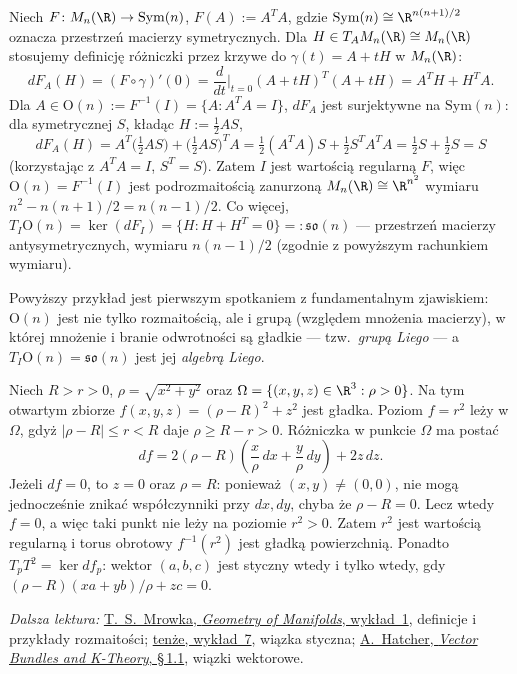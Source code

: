 \begin{przyklad}
Niech $F\colon M_n(\R)\to\mathrm{Sym}(n)$, $F(A):=A^TA$, gdzie $\mathrm{Sym}(n)\cong
\R^{n(n+1)/2}$ oznacza przestrzeń macierzy symetrycznych. Dla $H\in T_AM_n(\R)\cong M_n(\R)$
stosujemy definicję różniczki przez krzywe do $\gamma(t)=A+tH$ w $M_n(\R)$:
\[
dF_A(H)=(F\circ\gamma)'(0)=\frac{d}{dt}\Big|_{t=0}(A+tH)^T(A+tH)=A^TH+H^TA.
\]
Dla $A\in\mathrm{O}(n):=F^{-1}(I)=\{A:A^TA=I\}$, $dF_A$ jest surjektywne na
$\mathrm{Sym}(n)$: dla symetrycznej $S$, kładąc $H:=\tfrac12AS$,
\[
dF_A(H)=A^T\big(\tfrac12AS\big)+\big(\tfrac12AS\big)^TA=\tfrac12(A^TA)S+\tfrac12S^TA^TA=
\tfrac12S+\tfrac12S=S
\]
(korzystając z $A^TA=I$, $S^T=S$). Zatem $I$ jest wartością regularną $F$, więc
$\mathrm{O}(n)=F^{-1}(I)$ jest podrozmaitością zanurzoną $M_n(\R)\cong\R^{n^2}$ wymiaru
$n^2-n(n+1)/2=n(n-1)/2$. Co więcej, $T_I\mathrm{O}(n)=\ker(dF_I)=\{H:H+H^T=0\}=:
\mathfrak{so}(n)$ — przestrzeń macierzy antysymetrycznych, wymiaru $n(n-1)/2$ (zgodnie z
powyższym rachunkiem wymiaru).
\end{przyklad}

\begin{uwaga}
Powyższy przykład jest pierwszym spotkaniem z fundamentalnym zjawiskiem: $\mathrm{O}(n)$
jest nie tylko rozmaitością, ale i grupą (względem mnożenia macierzy), w której mnożenie i
branie odwrotności są gładkie — tzw.\ \emph{grupą Liego} — a $T_I\mathrm{O}(n)=
\mathfrak{so}(n)$ jest jej \emph{algebrą Liego}.
\end{uwaga}

\begin{przyklad}
Niech $R>r>0$, $\rho=\sqrt{x^2+y^2}$ oraz
$\Omega=\{(x,y,z)\in\R^3:\rho>0\}$. Na tym otwartym zbiorze
$f(x,y,z)=(\rho-R)^2+z^2$ jest gładka. Poziom $f=r^2$
leży w $\Omega$, gdyż $|\rho-R|\leq r<R$ daje $\rho\geq R-r>0$.
Różniczka w punkcie $\Omega$ ma postać
\[
df=2(\rho-R)\left(\frac{x}{\rho}\,dx+
\frac{y}{\rho}\,dy\right)+2z\,dz.
\]
Jeżeli $df=0$, to $z=0$ oraz $\rho=R$: ponieważ $(x,y)\ne(0,0)$,
nie mogą jednocześnie znikać współczynniki przy $dx,dy$, chyba że
$\rho-R=0$. Lecz wtedy $f=0$, a więc taki punkt nie leży na
poziomie $r^2>0$. Zatem $r^2$ jest wartością regularną i torus
obrotowy $f^{-1}(r^2)$ jest gładką powierzchnią. Ponadto
$T_pT^2=\ker df_p$: wektor $(a,b,c)$ jest styczny wtedy i tylko
wtedy, gdy $(\rho-R)(xa+yb)/\rho+zc=0$.
\end{przyklad}

\par\smallskip
{\footnotesize\noindent\emph{Dalsza lektura:}
\href{https://www.ocw.mit.edu/courses/18-965-geometry-of-manifolds-fall-2004/34fad8f392208544e2b1e9794c33cbe7_lecture1.pdf}
{T.~S.~Mrowka, \emph{Geometry of Manifolds}, wykład~1},
definicje i przykłady rozmaitości;
\href{https://www.ocw.mit.edu/courses/18-965-geometry-of-manifolds-fall-2004/de18bf0029c583cacffb09810879bb54_lecture7.pdf}
{tenże, wykład~7}, wiązka styczna;
\href{https://pi.math.cornell.edu/~hatcher/VBKT/VB.pdf}
{A.~Hatcher, \emph{Vector Bundles and K-Theory}, \S\,1.1},
wiązki wektorowe.\par}

\clearpage
